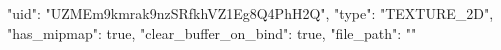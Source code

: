 {
    "uid": "UZMEm9kmrak9nzSRfkhVZ1Eg8Q4PhH2Q",
    "type": "TEXTURE_2D",
    "has_mipmap": true,
    "clear_buffer_on_bind": true,
    "file_path": ""
}